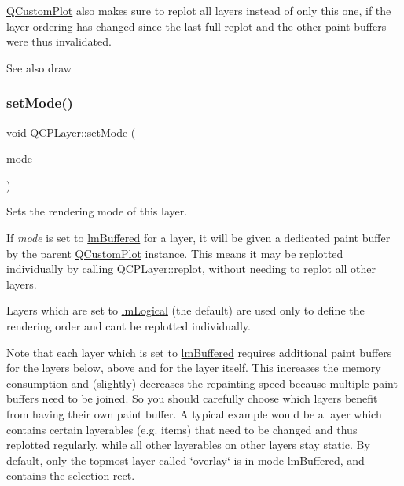 \mbox{\hyperlink{class_q_custom_plot}{Q\+Custom\+Plot}} also makes sure to replot all layers instead of only this one, if the layer ordering has changed since the last full replot and the other paint buffers were thus invalidated.

\begin{DoxySeeAlso}{See also}
draw 
\end{DoxySeeAlso}
\mbox{\label{class_q_c_p_layer_a938d57b04f4e4c23cedf1711f983919b}} 
\subsubsection{\texorpdfstring{set\+Mode()}{setMode()}}
{\footnotesize\ttfamily void Q\+C\+P\+Layer\+::set\+Mode (\begin{DoxyParamCaption}\item[{\mbox{\hyperlink{class_q_c_p_layer_a67dcfc1590be2a1f2227c5a39bb59c7c}{Q\+C\+P\+Layer\+::\+Layer\+Mode}}}]{mode }\end{DoxyParamCaption})}

Sets the rendering mode of this layer.

If {\itshape mode} is set to \mbox{\hyperlink{class_q_c_p_layer_a67dcfc1590be2a1f2227c5a39bb59c7cab581b9fab3007c4c65f057f4185d7538}{lm\+Buffered}} for a layer, it will be given a dedicated paint buffer by the parent \mbox{\hyperlink{class_q_custom_plot}{Q\+Custom\+Plot}} instance. This means it may be replotted individually by calling \mbox{\hyperlink{class_q_c_p_layer_adefd53b6db02f470151c416f42e37180}{Q\+C\+P\+Layer\+::replot}}, without needing to replot all other layers.

Layers which are set to \mbox{\hyperlink{class_q_c_p_layer_a67dcfc1590be2a1f2227c5a39bb59c7ca02eb5e9a4cb7f1baf1e2b6b99e3b87ce}{lm\+Logical}} (the default) are used only to define the rendering order and can\textquotesingle{}t be replotted individually.

Note that each layer which is set to \mbox{\hyperlink{class_q_c_p_layer_a67dcfc1590be2a1f2227c5a39bb59c7cab581b9fab3007c4c65f057f4185d7538}{lm\+Buffered}} requires additional paint buffers for the layers below, above and for the layer itself. This increases the memory consumption and (slightly) decreases the repainting speed because multiple paint buffers need to be joined. So you should carefully choose which layers benefit from having their own paint buffer. A typical example would be a layer which contains certain layerables (e.\+g. items) that need to be changed and thus replotted regularly, while all other layerables on other layers stay static. By default, only the topmost layer called \char`\"{}overlay\char`\"{} is in mode \mbox{\hyperlink{class_q_c_p_layer_a67dcfc1590be2a1f2227c5a39bb59c7cab581b9fab3007c4c65f057f4185d7538}{lm\+Buffered}}, and contains the selection rect.

